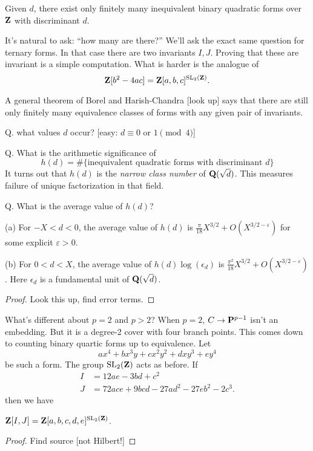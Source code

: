 \begin{theorem}[Gauss?]
Given $d$, there exist only finitely many inequivalent binary quadratic forms 
over $\mathbf{Z}$ with discriminant $d$. 
\end{theorem}

It's natural to ask: ``how many are there?'' We'll ask the exact same question 
for ternary forms. In that case there are two invariants $I,J$. Proving that these 
are invariant is a simple computation. What is harder is the analogue of 
\[
  \mathbf{Z}[b^2-4 a c]= \mathbf{Z}[a,b,c]^{\operatorname{SL}_2(\mathbf{Z})} .
\]

A general theorem of Borel and Harish-Chandra [look up] says that there 
are still only finitely many equivalence classes of forms with any given 
pair of invariants. 

Q. what values $d$ occur? [easy: $d\equiv 0$ or $1\pmod 4$]

Q. What is the arithmetic significance of 
\[
  h(d)=\#\{\text{inequivalent quadratic forms with discriminant }d\}
\]
It turns out that $h(d)$ is the \emph{narrow class number} of $\mathbf{Q}(\sqrt d)$. 
This measures failure of unique factorization in that field. 

Q. What is the average value of $h(d)$?

\begin{theorem}
(a) For $-X<d<0$, the average value of $h(d)$ is $\frac{\pi}{18} X^{3/2} + O(X^{3/2-\varepsilon})$ for some explicit $\varepsilon>0$. 

(b) For $0<d<X$, the average value of $h(d)\log(\epsilon_d)$ is 
$\frac{\pi^2}{18} X^{3/2}+O(X^{3/2-\varepsilon})$. Here 
$\epsilon_d$ is a fundamental unit of $\mathbf{Q}(\sqrt d)$. 
\end{theorem}
\begin{proof}
Look this up, find error terms. 
\end{proof}

What's different about $p=2$ and $p>2$? When $p=2$, 
$C\to \mathbf{P}^{p-1}$ isn't an embedding. But it is a degree-2 cover with four 
branch points. This comes down to counting binary quartic forms up to 
equivalence. Let 
\[
  a x^4 + b x^3 y + c x^2 y^2 + d x y^3 + e y^4 
\]
be such a form. The group $\operatorname{SL}_2(\mathbf{Z})$ acts as before. If 
\begin{align*}
  I &= 12 a e - 3 b d + c^2 \\
  J &= 72 a c e + 9 b c d - 27 a d^2 - 27 e b^2 - 2 c^3 .
\end{align*}
then we have 

\begin{theorem}
$\mathbf{Z}[I,J] = \mathbf{Z}[a,b,c,d,e]^{\operatorname{SL}_2(\mathbf{Z})}$. 
\end{theorem}
\begin{proof}
Find source [not Hilbert!]
\end{proof}

